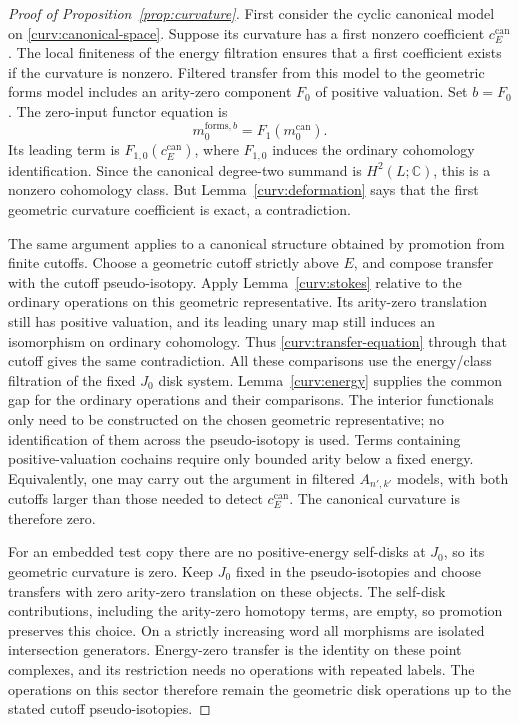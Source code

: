 \documentclass[11pt]{article}
\numberwithin{equation}{section}
\theoremstyle{definition}
\theoremstyle{remark}
\begin{document}
\begin{proof}[Proof of Proposition~\ref{prop:curvature}]
First consider the cyclic canonical model on
\eqref{curv:canonical-space}.  Suppose its curvature has a first
nonzero coefficient $c_E^{\mathrm{can}}$.  The local finiteness of
the energy filtration ensures that a first coefficient exists if the
curvature is nonzero.  Filtered transfer from this model to the
geometric forms model includes an arity-zero component $F_0$ of
positive valuation.  Set $b=F_0$.  The zero-input functor equation is
\begin{equation}\label{curv:transfer-equation}
 m_0^{\mathrm{forms},b}
       =F_1(m_0^{\mathrm{can}}).
\end{equation}
Its leading term is
$F_{1,0}(c_E^{\mathrm{can}})$, where $F_{1,0}$ induces the ordinary
cohomology identification.  Since the canonical degree-two summand
is $H^2(L;\mathbb C)$, this is a nonzero cohomology class.  But
Lemma~\ref{curv:deformation} says that the first geometric curvature
coefficient is exact, a contradiction.

The same argument applies to a canonical structure obtained by
promotion from finite cutoffs.  Choose a geometric cutoff strictly above $E$, and compose transfer
with the cutoff pseudo-isotopy.  Apply Lemma~\ref{curv:stokes}
relative to the ordinary operations on this geometric representative.  Its arity-zero
translation still has positive valuation, and its leading unary map
still induces an isomorphism on ordinary cohomology.  Thus
\eqref{curv:transfer-equation} through that cutoff gives the same
contradiction.  All these comparisons use the energy/class filtration
of the fixed $J_0$ disk system.  Lemma~\ref{curv:energy} supplies the common gap for the ordinary
operations and their comparisons.  The interior functionals only
need to be constructed on the chosen geometric representative; no
identification of them across the pseudo-isotopy is used.  Terms containing positive-valuation cochains require
only bounded arity below a fixed energy.  Equivalently, one may carry
out the argument in filtered $A_{n',k'}$ models, with both cutoffs
larger than those needed to detect $c_E^{\mathrm{can}}$.
The canonical curvature is therefore zero.

For an embedded test copy there are no positive-energy self-disks
at $J_0$, so its geometric curvature is zero.  Keep $J_0$ fixed in
the pseudo-isotopies and choose transfers with zero arity-zero
translation on these objects.  The self-disk contributions, including
the arity-zero homotopy terms, are empty, so promotion preserves this
choice.  On a strictly increasing word all morphisms are isolated
intersection generators.  Energy-zero transfer is the identity on
these point complexes, and its restriction needs no operations with
repeated labels.  The operations on this sector therefore remain the
geometric disk operations up to the stated cutoff pseudo-isotopies.


\end{proof}
\end{document}
